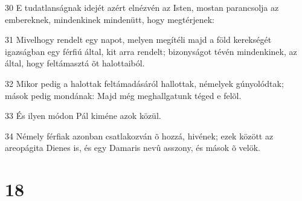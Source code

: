 \par 30 E tudatlanságnak idejét azért elnézvén az Isten, mostan parancsolja az embereknek, mindenkinek mindenütt, hogy  megtérjenek:
\par 31 Mivelhogy rendelt egy napot, melyen megítéli majd a föld kerekségét igazságban egy férfiú által, kit arra rendelt; bizonyságot tévén mindenkinek, az által, hogy feltámasztá õt  halottaiból.
\par 32 Mikor pedig a halottak feltámadásáról hallottak, némelyek gúnyolódtak; mások pedig mondának: Majd még meghallgatunk téged e felõl.
\par 33 És ilyen módon Pál kiméne azok közül.
\par 34 Némely férfiak azonban csatlakozván õ hozzá, hivének; ezek között az areopágita Dienes is, és egy Damaris nevû asszony, és mások õ velök.

\chapter{18}

